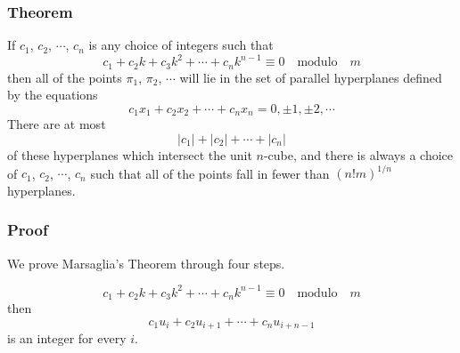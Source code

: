 \documentclass[12pt,a4paper]{article}
\begin{document}
\subsubsection{Theorem}
If $c_1$, $c_2$, $\cdots$, $c_n$ is any choice of integers such that 
\begin{equation*}
c_1 + c_2k + c_3 k^2 + \cdots + c_n k^{n-1}\equiv 0 \quad \text{modulo} \quad m
\end{equation*}
then all of the points $\pi_1$, $\pi_2$, $\cdots$ will lie in the set of parallel hyperplanes defined by the equations 
\begin{equation*}
c_1x_1 + c_2x_2 + \cdots + c_n x_n = 0, \pm 1, \pm 2, \cdots
\end{equation*}
There are at most 
\begin{equation*}
|c_1| + |c_2| + \cdots +|c_n| 
\end{equation*}
of these hyperplanes which intersect the unit $n$-cube, and there is always a choice of $c_1$, $c_2$, $\cdots$, $c_n$ such that all of the points fall in fewer than $(n!m)^{1/n}$ hyperplanes.



\subsubsection{Proof}
We prove Marsaglia's Theorem through four steps.


\begin{equation}
c_1 + c_2k + c_3 k^2 + \cdots + c_n k^{n-1}\equiv 0 \quad \text{modulo} \quad m
\label{eq:assumption}
\end{equation}
then 
\begin{equation*}
c_1u_i + c_2u_{i+1} + \cdots + c_nu_{i+n-1}
\end{equation*}
is an integer for every $i$.
\end{document}
